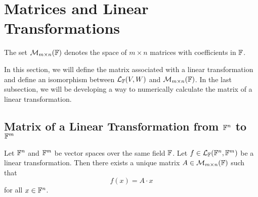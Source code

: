 \section{Matrices and Linear Transformations} \label{section3}

\begin{remark}
    The set $\mathcal{M}_{m \times n}(\mathbb{F})$ denotes the space of $m \times n$
    matrices with coefficients in $\mathbb{F}$.
\end{remark}

In this section, we will define the matrix associated with a linear
transformation and define an isomorphism between $\mathcal{L}_{\mathbb{F}}(V, W)$
and $\mathcal{M}_{m \times n}(\mathbb{F})$. In the last subsection, we will be developing a way
to numerically calculate the matrix of a linear transformation.


\subsection{Matrix of a Linear Transformation from $\mathbb{F}^{n}$ to $\mathbb{F}^{m}$}

\begin{theorem} \label{thrm5}
    Let $\mathbb{F}^{n}$ and $\mathbb{F}^{m}$ be vector spaces over the same field $\mathbb{F}$.
    Let $f \in \mathcal{L}_{\mathbb{F}}(\mathbb{F}^{n}, \mathbb{F}^{m})$ be a
    linear transformation. Then there exists a unique matrix
    $A \in \mathcal{M}_{m \times n}(\mathbb{F})$ such that
    \[
        f(x) = A \cdot x
    \]
    for all $x \in \mathbb{F}^{n}$.
\end{theorem}

